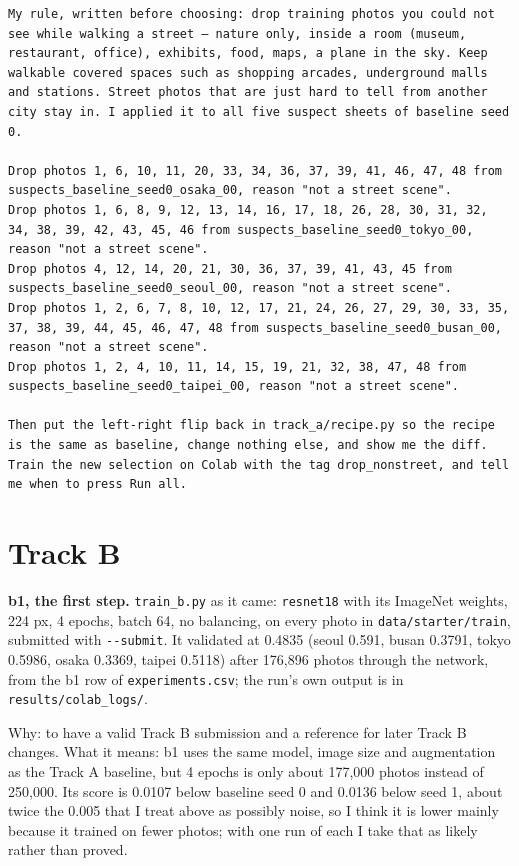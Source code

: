 \documentclass[11pt]{article}
\begin{document}
\begin{Verbatim}[breaklines,breakanywhere,fontsize=\footnotesize,frame=single]
My rule, written before choosing: drop training photos you could not see while walking a street — nature only, inside a room (museum, restaurant, office), exhibits, food, maps, a plane in the sky. Keep walkable covered spaces such as shopping arcades, underground malls and stations. Street photos that are just hard to tell from another city stay in. I applied it to all five suspect sheets of baseline seed 0.

Drop photos 1, 6, 10, 11, 20, 33, 34, 36, 37, 39, 41, 46, 47, 48 from suspects_baseline_seed0_osaka_00, reason "not a street scene".
Drop photos 1, 6, 8, 9, 12, 13, 14, 16, 17, 18, 26, 28, 30, 31, 32, 34, 38, 39, 42, 43, 45, 46 from suspects_baseline_seed0_tokyo_00, reason "not a street scene".
Drop photos 4, 12, 14, 20, 21, 30, 36, 37, 39, 41, 43, 45 from suspects_baseline_seed0_seoul_00, reason "not a street scene".
Drop photos 1, 2, 6, 7, 8, 10, 12, 17, 21, 24, 26, 27, 29, 30, 33, 35, 37, 38, 39, 44, 45, 46, 47, 48 from suspects_baseline_seed0_busan_00, reason "not a street scene".
Drop photos 1, 2, 4, 10, 11, 14, 15, 19, 21, 32, 38, 47, 48 from suspects_baseline_seed0_taipei_00, reason "not a street scene".

Then put the left-right flip back in track_a/recipe.py so the recipe is the same as baseline, change nothing else, and show me the diff. Train the new selection on Colab with the tag drop_nonstreet, and tell me when to press Run all.
\end{Verbatim}

\section*{Track B}

\textbf{b1, the first step.} \texttt{train\_b.py} as it came: \texttt{resnet18}
with its ImageNet weights, 224 px, 4 epochs, batch 64, no balancing, on every
photo in \texttt{data/starter/train}, submitted with \texttt{-{}-submit}. It
validated at 0.4835 (seoul 0.591, busan 0.3791, tokyo 0.5986, osaka 0.3369,
taipei 0.5118) after 176,896 photos through the network, from the b1 row of
\texttt{experiments.csv}; the run's own output is in
\texttt{results/colab\_logs/}.

Why: to have a valid Track B submission and a reference for later Track B
changes. What it means: b1 uses the same model, image size and augmentation as
the Track A baseline, but 4 epochs is only about 177,000 photos instead of
250,000. Its score is 0.0107 below baseline seed 0 and 0.0136 below seed 1,
about twice the 0.005 that I treat above as possibly noise, so I think it is
lower mainly because it trained on fewer photos; with one run of each I take
that as likely rather than proved.
\end{document}

